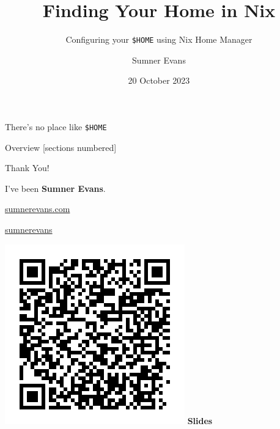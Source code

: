 \documentclass{nix}
\title{Finding Your Home in Nix}
\subtitle{Configuring your \texttt{\$HOME} using Nix Home Manager}
\author{Sumner Evans}
\date{20 October 2023}
\newcommand{\splitslide}[4]{
    \noindent
    \begin{minipage}{#1 \textwidth - #2 }
        #3
    \end{minipage}%
    \hspace{ \dimexpr #2 * 2 \relax }%
    \begin{minipage}{\textwidth - #1 \textwidth - #2 }
        #4
    \end{minipage}
}
\begin{document}
\begin{frame}{There's no place like \texttt{\$HOME}}
\end{frame}


\begin{frame}{Overview}
    [sections numbered]
    \tableofcontents[hideallsubsections]
\end{frame}

\begin{frame}{Thank You!}
    \splitslide{0.65}{1em}{
        \begin{LARGE}
            I've been \textbf{Sumner Evans}.
        \end{LARGE}
        \vspace{1cm}

        \begin{Large}
            {\faGlobe} \href{https://sumnerevans.com}{sumnerevans.com}

            {\faGithub} \href{https://github.com/sumnerevans}{sumnerevans}
        \end{Large}
    }{
        \begin{center}
            \includegraphics[width=0.4\textheight]{./images/slides-qr}
            \textbf{Slides}
        \end{center}
    }
\end{frame}
\end{document}
